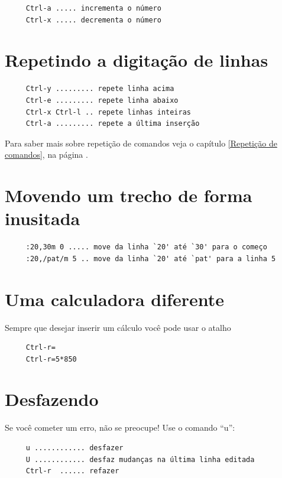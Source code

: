 \documentclass[10pt,a4paper,openany]{book}
\begin{document}
\begin{verbatim}
     Ctrl-a ..... incrementa o número
     Ctrl-x ..... decrementa o número
\end{verbatim}

\section{Repetindo a digitação de linhas}
\label{Repetindo a digitação de linhas}

\begin{verbatim}
     Ctrl-y ......... repete linha acima
     Ctrl-e ......... repete linha abaixo
     Ctrl-x Ctrl-l .. repete linhas inteiras
     Ctrl-a ......... repete a última inserção
\end{verbatim}

Para saber mais sobre repetição de comandos veja o capítulo \ref{Repetição de comandos},
na página \pageref{Repetição de comandos}.

\section{Movendo um trecho de forma inusitada}
\label{Movendo um trecho de forma inusitada}

\begin{verbatim}
     :20,30m 0 ..... move da linha `20' até `30' para o começo
     :20,/pat/m 5 .. move da linha `20' até `pat' para a linha 5
\end{verbatim}


\section{Uma calculadora diferente}
\label{Uma calculadora diferente}
Sempre que desejar inserir um cálculo você pode usar o atalho

\begin{verbatim}
     Ctrl-r=
     Ctrl-r=5*850
\end{verbatim}


\section{Desfazendo}
\label{Desfazendo}

Se você cometer um erro, não se preocupe! Use o comando ``u'':

\begin{verbatim}
     u ............ desfazer
     U ............ desfaz mudanças na última linha editada
     Ctrl-r  ...... refazer
\end{verbatim}
\end{document}
